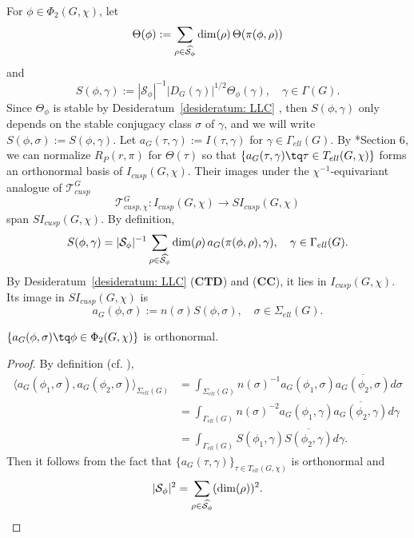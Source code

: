 \documentclass[11pt,letterpaper]{amsart}
\numberwithin{equation}{section}
\begin{document}
For $\phi \in \Phi_2(G, \chi)$, let 
\[
\Theta(\phi) := \sum_{\rho \in \widehat{\mathcal{S}_{\phi}}} {\rm dim}(\rho) \, \Theta(\pi(\phi, \rho))
\]
and
\[
S(\phi, \gamma) := |\mathcal{S}_{\phi}|^{-1}|D_{G}(\gamma)|^{1/2} \Theta_{\phi}(\gamma), \quad \gamma \in \Gamma(G).
\]
Since $\Theta_{\phi}$ is stable by Desideratum~\ref{desideratum: LLC} \Sta, then $S(\phi, \gamma)$ only depends on the stable conjugacy class $\sigma$ of $\gamma$, and we will write $S(\phi, \sigma) := S(\phi, \gamma)$. Let $a_{G}(\tau, \gamma) := I(\tau, \gamma)$ for $\gamma \in \Gamma_{ell}(G)$. By \cite{Art93}*{Section 6}, we can normalize $R_{P}(r, \pi)$ for $\Theta(\tau)$ so that $\{a_{G}(\tau, \gamma)\tq \tau \in T_{ell}(G, \chi)\}$ forms an orthonormal basis of $I_{cusp}(G, \chi)$. Their images under the $\chi^{-1}$-equivariant analogue of $\mathcal{T}^{G}_{cusp}$
\[
\mathcal{T}^{G}_{cusp, \chi}: I_{cusp}(G, \chi) \rightarrow SI_{cusp}(G, \chi)
\]
span $SI_{cusp}(G, \chi)$. By definition,
\[
S(\phi, \gamma) = |\mathcal{S}_{\phi}|^{-1} \sum_{\rho \in \widehat{\mathcal{S}_{\phi}}} {\rm dim}(\rho) \, a_{G}(\pi(\phi, \rho), \gamma), \quad \gamma \in \Gamma_{ell}(G).
\]
By Desideratum~\ref{desideratum: LLC} ($\mathbf{CTD}$) and ($\mathbf{CC}$), it lies in $I_{cusp}(G, \chi)$. Its image in $SI_{cusp}(G, \chi)$ is
\[
a_{G}(\phi, \sigma) := n(\sigma) S(\phi, \sigma), \quad \sigma \in \Sigma_{ell}(G).
\]

\begin{lemma}
$\{a_{G}(\phi, \sigma)\tq \phi \in \Phi_2(G, \chi)\}$ is orthonormal.
\end{lemma}

\begin{proof}
By definition (cf. \cite[]{Art96}),
\begin{align*}
\langle a_{G}(\phi_1, \sigma), a_{G}(\phi_2, \sigma) \rangle_{\Sigma_{ell}(G)} & = \int_{\Sigma_{ell}(G)} n(\sigma)^{-1} a_{G}(\phi_1, \sigma) \overline{a_{G}(\phi_2, \sigma)} d\sigma \\
& = \int_{\Gamma_{ell}(G)} n(\sigma)^{-2} a_{G}(\phi_1, \gamma) \overline{a_{G}(\phi_2, \gamma)} d\gamma \\
& = \int_{\Gamma_{ell}(G)} S(\phi_1, \gamma) \overline{S(\phi_2, \gamma)} d\gamma.
 \end{align*} 
Then it follows from the fact that $\{a_{G}(\tau, \gamma)\}_{\tau \in T_{ell}(G, \chi)}$ is orthonormal and 
\[
|\mathcal{S}_{\phi}|^2 = \sum_{\rho \in \widehat{\mathcal{S}_{\phi}}} ({\rm dim}(\rho))^2. \qedhere
\]
\end{proof}
\end{document}
